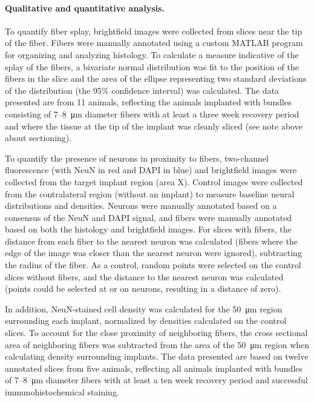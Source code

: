 \paragraph{Qualitative and quantitative analysis.} To quantify fiber 
splay, brightfield images were collected from slices near the tip of 
the fiber. Fibers were manually annotated using a custom MATLAB 
program for organizing and analyzing histology. To calculate a measure 
indicative of the splay of the fibers, a bivariate normal distribution 
was fit to the position of the fibers in the slice and the area of the 
ellipse representing two standard deviations of the distribution (the 
95\% confidence interval) was calculated. The data presented are from 
11 animals, reflecting the animals implanted with bundles consisting 
of 7--8~\si{\micro\meter} diameter fibers with at least a three week recovery 
period and where the tissue at the tip of the implant was cleanly sliced 
(see note above about sectioning).

To quantify the presence of neurons in proximity to fibers, two-channel 
fluorescence (with NeuN in red and DAPI in blue) and brightfield 
images were collected from the target implant region (area X). Control 
images were collected from the contralateral region (without an implant) 
to measure baseline neural distributions and densities. Neurons were 
manually annotated based on a consensus of the NeuN and 
DAPI signal, and fibers were manually annotated based on both the 
histology and brightfield images. For slices with fibers, the distance from each 
fiber to the nearest neuron was calculated (fibers where the edge of the 
image was closer than the nearest neuron were ignored), subtracting the 
radius of the fiber. As a control, random points were selected on the control slices 
without fibers, and the distance to the nearest neuron was calculated 
(points could be selected at or on neurons, resulting in a distance of 
zero).

In addition, NeuN-stained cell density was calculated for the 
50~\si{\micro\meter} region surrounding each implant, normalized by 
densities calculated on the control slices. To account for the close 
proximity of neighboring fibers, the cross sectional area of neighboring fibers 
was subtracted from the area of the 50~\si{\micro\meter} region when calculating density surrounding 
implants. The data presented are based on twelve annotated slices from 
five animals, reflecting all animals implanted with bundles of 
7--8~\si{\micro\meter} diameter fibers with at least a ten week recovery 
period and successful immunohistochemical staining.

